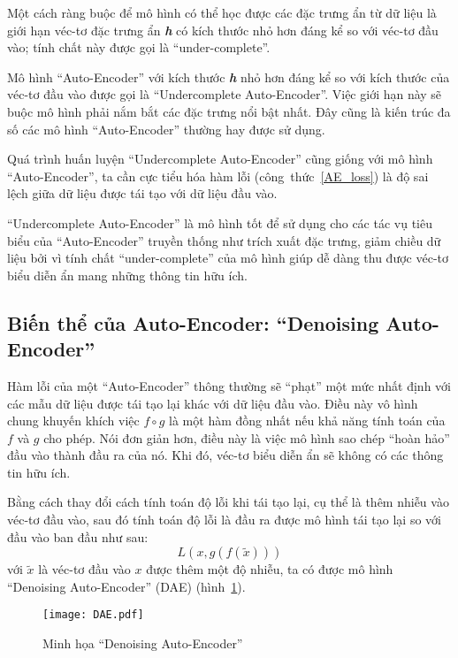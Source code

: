     Một cách ràng buộc để mô hình có thể học được các đặc trưng ẩn từ dữ liệu
    là giới hạn véc-tơ đặc trưng ẩn \textbf{\textit{h}} có kích thước nhỏ hơn đáng kể so với véc-tơ đầu vào;
    tính chất này được gọi là ``under-complete''.
    
    Mô hình ``Auto-Encoder'' với kích thước \textbf{\textit{h}} nhỏ hơn đáng kể so với kích thước của véc-tơ đầu vào
    được gọi là ``Undercomplete Auto-Encoder''. Việc giới hạn này sẽ buộc mô hình phải nắm bắt các đặc trưng
    nổi bật nhất. Đây cũng là kiến trúc đa số các mô hình ``Auto-Encoder'' thường hay được sử dụng.

    Quá trình huấn luyện ``Undercomplete Auto-Encoder'' cũng giống với mô hình ``Auto-Encoder'',
    ta cần cực tiểu hóa hàm lỗi (công~thức~\ref{AE_loss}) là độ sai lệch giữa dữ liệu được tái tạo
    với dữ liệu đầu vào.

    ``Undercomplete Auto-Encoder'' là mô hình tốt để sử dụng cho các tác vụ tiêu biểu của ``Auto-Encoder'' truyền thống
    như trích xuất đặc trưng, giảm chiều dữ liệu 
    bởi vì tính chất ``under-complete'' của mô hình giúp dễ dàng thu được véc-tơ biểu diễn ẩn mang những thông tin hữu ích.


    \subsection{Biến thể của Auto-Encoder: ``Denoising Auto-Encoder''}
    \label{chap2/subsec12}
    
    Hàm lỗi của một ``Auto-Encoder'' thông thường sẽ ``phạt'' một mức nhất định với các mẫu dữ liệu được tái tạo lại
    khác với dữ liệu đầu vào. Điều này vô hình chung khuyến khích việc 
    $ f \circ g $ là một hàm đồng nhất nếu khả năng tính toán của $f$ và $g$ cho phép. Nói đơn giản hơn, điều này là việc mô hình sao chép ``hoàn hảo'' đầu vào thành đầu ra của nó.
    Khi đó, véc-tơ biểu diễn ẩn sẽ không có các thông tin hữu ích. 

    Bằng cách thay đổi cách tính toán độ lỗi khi tái tạo lại, cụ thể là thêm nhiễu vào véc-tơ đầu vào, 
    sau đó tính toán độ lỗi là đầu ra được mô hình tái tạo lại so với đầu vào ban đầu như sau:
    \begin{equation}
        L(x, g(f(\tilde{x})))
    \end{equation}
    với 
    \begin{math} \tilde{x} \end{math}
    là véc-tơ đầu vào 
    \begin{math}
        x
    \end{math} 
    được thêm một độ nhiễu, ta có được mô hình ``Denoising Auto-Encoder'' (DAE) (hình~\ref{fig_DAE}). 
    \begin{figure}
        \centering
        \texttt{[image: DAE.pdf]}
        \caption{Minh họa ``Denoising Auto-Encoder''}
        \label{fig_DAE}
    \end{figure}
    
